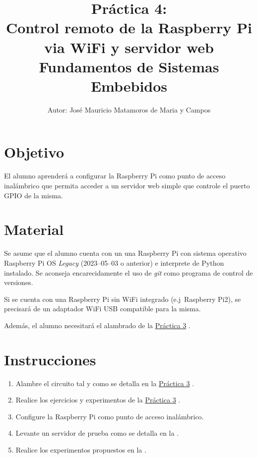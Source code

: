 \documentclass[letterpaper,10.5pt]{article}
\author{\footnotesize Autor: José Mauricio Matamoros de Maria y Campos}
\title{Práctica 4:\\Control remoto de la Raspberry Pi via WiFi y servidor web\\
{\large Fundamentos de Sistemas Embebidos}}
\date{}
\newcommand{\prevpract}{%
	\href{https://github.com/kyordhel/FSEm/tree/master/practica03}{Práctica 3}%
	\xspace{}%
}
\begin{document}
\maketitle

\section{Objetivo}%
\label{sec:objective}
El alumno aprenderá a configurar la Raspberry Pi como punto de acceso inalámbrico que permita acceder a un servidor web simple que controle el puerto GPIO de la misma.%


\section{Material}%
\label{sec:material}
Se asume que el alumno cuenta con un una Raspberry Pi con sistema operativo Raspberry Pi OS \emph{Legacy} (2023--05--03 o anterior) e interprete de Python instalado. Se aconseja encarecidamente el uso de \textit{git} como programa de control de versiones.

Si se cuenta con una Raspberry Pi sin WiFi integrado (e.j~Raspberry Pi2), se precisará de un adaptador WiFi USB compatible para la misma.

Además, el alumno necesitará el alambrado de la \prevpract{}.

\section{Instrucciones}%
\label{sec:instructions}
\begin{enumerate}[noitemsep]
	\item Alambre el circuito tal y como se detalla en la \prevpract{}.
	\item Realice los ejercicios y experimentos de la \prevpract{}.
	\item Configure la Raspberry Pi como punto de acceso inalámbrico.
	\item Levante un servidor de prueba como se detalla en la .
	\item Realice los experimentos propuestos en la .
\end{enumerate}
\end{document}

